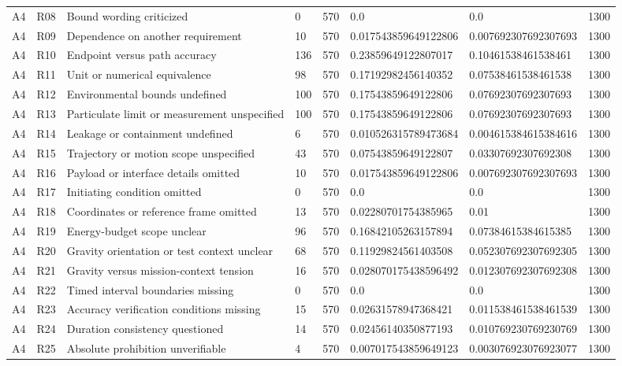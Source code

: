 \begin{tabular}{llllllll}
A4 & R08 & Bound wording criticized & 0 & 570 & 0.0 & 0.0 & 1300 \\
A4 & R09 & Dependence on another requirement & 10 & 570 & 0.017543859649122806 & 0.007692307692307693 & 1300 \\
A4 & R10 & Endpoint versus path accuracy & 136 & 570 & 0.23859649122807017 & 0.10461538461538461 & 1300 \\
A4 & R11 & Unit or numerical equivalence & 98 & 570 & 0.17192982456140352 & 0.07538461538461538 & 1300 \\
A4 & R12 & Environmental bounds undefined & 100 & 570 & 0.17543859649122806 & 0.07692307692307693 & 1300 \\
A4 & R13 & Particulate limit or measurement unspecified & 100 & 570 & 0.17543859649122806 & 0.07692307692307693 & 1300 \\
A4 & R14 & Leakage or containment undefined & 6 & 570 & 0.010526315789473684 & 0.004615384615384616 & 1300 \\
A4 & R15 & Trajectory or motion scope unspecified & 43 & 570 & 0.07543859649122807 & 0.03307692307692308 & 1300 \\
A4 & R16 & Payload or interface details omitted & 10 & 570 & 0.017543859649122806 & 0.007692307692307693 & 1300 \\
A4 & R17 & Initiating condition omitted & 0 & 570 & 0.0 & 0.0 & 1300 \\
A4 & R18 & Coordinates or reference frame omitted & 13 & 570 & 0.02280701754385965 & 0.01 & 1300 \\
A4 & R19 & Energy-budget scope unclear & 96 & 570 & 0.16842105263157894 & 0.07384615384615385 & 1300 \\
A4 & R20 & Gravity orientation or test context unclear & 68 & 570 & 0.11929824561403508 & 0.052307692307692305 & 1300 \\
A4 & R21 & Gravity versus mission-context tension & 16 & 570 & 0.028070175438596492 & 0.012307692307692308 & 1300 \\
A4 & R22 & Timed interval boundaries missing & 0 & 570 & 0.0 & 0.0 & 1300 \\
A4 & R23 & Accuracy verification conditions missing & 15 & 570 & 0.02631578947368421 & 0.011538461538461539 & 1300 \\
A4 & R24 & Duration consistency questioned & 14 & 570 & 0.02456140350877193 & 0.010769230769230769 & 1300 \\
A4 & R25 & Absolute prohibition unverifiable & 4 & 570 & 0.007017543859649123 & 0.003076923076923077 & 1300 \\

\end{tabular}
